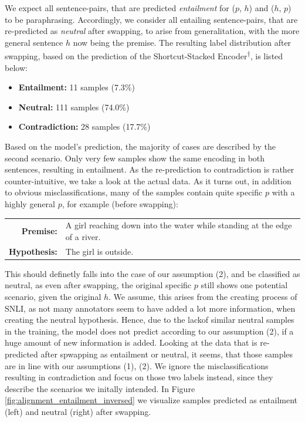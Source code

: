 We expect all sentence-pairs, that are predicted \textit{entailment} for ($p$, $h$) and ($h$, $p$) to be paraphrasing. Accordingly, we consider all entailing sentence-pairs, that are re-predicted as \textit{neutral} after swapping, to arise from generalitation, with the more general sentence $h$ now being the premise. The resulting label distribution after swapping, based on the prediction of the Shortcut-Stacked Encoder\textsuperscript{$\dagger$}, is listed below:
\begin{itemize}
\item \textbf{Entailment:} 11 samples (7.3\%)
\item \textbf{Neutral:} 111 samples (74.0\%)
\item \textbf{Contradiction:} 28 samples (17.7\%)
\end{itemize}
Based on the model's prediction, the majority of cases are described by the second scenario. Only very few samples show the same encoding in both sentences, resulting in entailment. As the re-prediction to contradiction is rather counter-intuitive, we take a look at the actual data. As it turns out, in addition to obvious misclassifications, many of the samples contain quite specific $p$ with a highly general $p$, for example (before swapping):
\begin{center}
\begin{tabular}{rl}
\textbf{Premise:} & A girl reaching down into the water while standing at the edge of a river. \\
\textbf{Hypothesis:} & The girl is outside.
\end{tabular}
\end{center}
This should definetly falls into the case of our assumption (2), and be classified as neutral, as even after swapping, the original specific $p$ still shows one potential scenario, given the original $h$. We assume, this arises from the creating process of \ac{SNLI}, as not many annotators seem to have added a lot more information, when creating the neutral hypothesis. Hence, due to the lackof similar neutral samples in the training, the model does not predict according to our assumption (2), if a huge amount of new information is added. Looking at the data that is re-predicted after spwapping as entailment or neutral, it seems, that those samples are in line with our assumptions (1), (2). We ignore the misclassifications resulting in contradiction and focus on those two labels instead, since they describe the scenarios we initally intended. In Figure \ref{fig:alignment_entailment_inversed} we visualize samples predicted as entailment (left) and neutral (right) after swapping.
